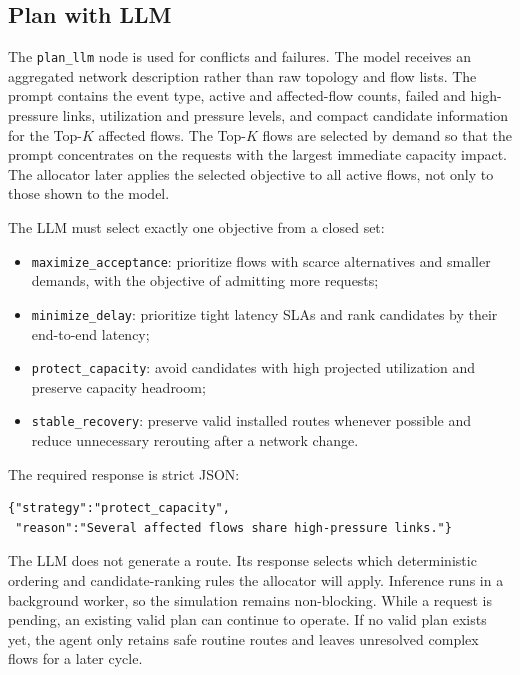 \subsection{Plan with LLM}

The \texttt{plan\_llm} node is used for conflicts and failures. The model receives an
aggregated network description rather than raw topology and flow lists. The prompt
contains the event type, active and affected-flow counts, failed and high-pressure links,
utilization and pressure levels, and compact candidate information for the Top-$K$
affected flows. The Top-$K$ flows are selected by demand so that the prompt concentrates
on the requests with the largest immediate capacity impact. The allocator later applies
the selected objective to all active flows, not only to those shown to the model.

The LLM must select exactly one objective from a closed set:

\begin{itemize}
    \item \texttt{maximize\_acceptance}: prioritize flows with scarce alternatives and
    smaller demands, with the objective of admitting more requests;
    \item \texttt{minimize\_delay}: prioritize tight latency SLAs and rank candidates
    by their end-to-end latency;
    \item \texttt{protect\_capacity}: avoid candidates with high projected utilization
    and preserve capacity headroom;
    \item \texttt{stable\_recovery}: preserve valid installed routes whenever possible
    and reduce unnecessary rerouting after a network change.
\end{itemize}

The required response is strict JSON:

\begin{verbatim}
{"strategy":"protect_capacity",
 "reason":"Several affected flows share high-pressure links."}
\end{verbatim}

The LLM does not generate a route. Its response selects which deterministic ordering
and candidate-ranking rules the allocator will apply. Inference runs in a background
worker, so the simulation remains non-blocking. While a request is pending, an existing
valid plan can continue to operate. If no valid plan exists yet, the agent only retains
safe routine routes and leaves unresolved complex flows for a later cycle.

